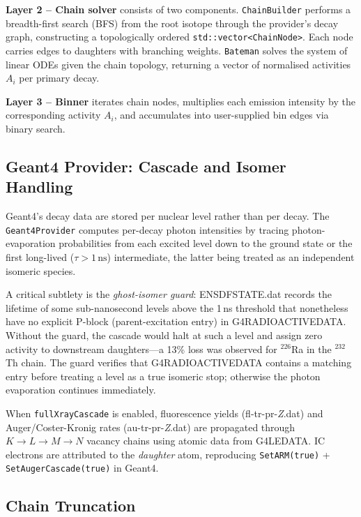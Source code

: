 \documentclass[journal]{IEEEtran}
\begin{document}
\textbf{Layer 2 -- Chain solver} consists of two components.
\texttt{ChainBuilder} performs a breadth-first search (BFS) from the root isotope
through the provider's decay graph, constructing a topologically ordered
\texttt{std::vector<ChainNode>}.
Each node carries edges to daughters with branching weights.
\texttt{Bateman} solves the system of linear ODEs given the chain topology,
returning a vector of normalised activities $A_i$ per primary decay.

\textbf{Layer 3 -- Binner} iterates chain nodes, multiplies each emission
intensity by the corresponding activity $A_i$, and accumulates into user-supplied
bin edges via binary search.

\subsection{Geant4 Provider: Cascade and Isomer Handling}

Geant4's decay data are stored per nuclear level rather than per decay.
The \texttt{Geant4Provider} computes per-decay photon intensities by tracing
photon-evaporation probabilities from each excited level down to the ground state
or the first long-lived ($\tau > 1\,\text{ns}$) intermediate, the latter being
treated as an independent isomeric species.

A critical subtlety is the \emph{ghost-isomer guard}: ENSDFSTATE.dat records
the lifetime of some sub-nanosecond levels above the 1\,ns threshold that nonetheless
have no explicit P-block (parent-excitation entry) in G4RADIOACTIVEDATA.
Without the guard, the cascade would halt at such a level and assign zero activity
to downstream daughters---a 13\% loss was observed for $^{226}$Ra in the
$^{232}$Th chain.
The guard verifies that G4RADIOACTIVEDATA contains a matching entry before
treating a level as a true isomeric stop; otherwise the photon evaporation
continues immediately.

When \texttt{fullXrayCascade} is enabled, fluorescence yields (fl-tr-pr-\textit{Z}.dat)
and Auger/Coster-Kronig rates (au-tr-pr-\textit{Z}.dat) are propagated through
$K\to L\to M\to N$ vacancy chains using atomic data from G4LEDATA.
IC electrons are attributed to the \emph{daughter} atom, reproducing
\texttt{SetARM(true)} + \texttt{SetAugerCascade(true)} in Geant4.

\subsection{Chain Truncation}
\end{document}
